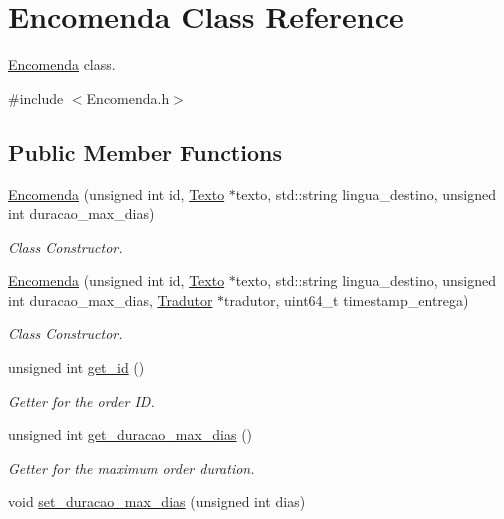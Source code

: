 \hypertarget{class_encomenda}{\section{Encomenda Class Reference}
\label{class_encomenda}
}


\hyperlink{class_encomenda}{Encomenda} class.  




{\ttfamily \#include $<$Encomenda.\-h$>$}

\subsection*{Public Member Functions}
\begin{DoxyCompactItemize}
\item 
\hyperlink{class_encomenda_acd872b2d444252423746ee7529b48ae8}{Encomenda} (unsigned int id, \hyperlink{class_texto}{Texto} $\ast$texto, std\-::string lingua\-\_\-destino, unsigned int duracao\-\_\-max\-\_\-dias)
\begin{DoxyCompactList}\small\item\em Class Constructor. \end{DoxyCompactList}\item 
\hyperlink{class_encomenda_a5009ce207f856836a16e93a6454e93b8}{Encomenda} (unsigned int id, \hyperlink{class_texto}{Texto} $\ast$texto, std\-::string lingua\-\_\-destino, unsigned int duracao\-\_\-max\-\_\-dias, \hyperlink{class_tradutor}{Tradutor} $\ast$tradutor, uint64\-\_\-t timestamp\-\_\-entrega)
\begin{DoxyCompactList}\small\item\em Class Constructor. \end{DoxyCompactList}\item 
unsigned int \hyperlink{class_encomenda_a600345853bc2238c189de0afcd1c8d09}{get\-\_\-id} ()
\begin{DoxyCompactList}\small\item\em Getter for the order I\-D. \end{DoxyCompactList}\item 
unsigned int \hyperlink{class_encomenda_a179dcd8d6ccaa8de0bf87a922c5ce2f8}{get\-\_\-duracao\-\_\-max\-\_\-dias} ()
\begin{DoxyCompactList}\small\item\em Getter for the maximum order duration. \end{DoxyCompactList}\item 
void \hyperlink{class_encomenda_ab3b5fc8fdde834b5c80f42ff0a2bf88b}{set\-\_\-duracao\-\_\-max\-\_\-dias} (unsigned int dias)

\end{DoxyCompactItemize}
